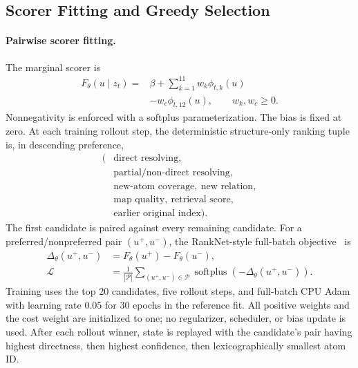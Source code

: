 \subsection{Scorer Fitting and Greedy Selection}
\label{supp:scorer-selector}

\paragraph{Pairwise scorer fitting.}
The marginal scorer is
\begin{equation}
\begin{aligned}
F_\theta(u\mid z_t)
={}&\beta+\sum_{k=1}^{11}w_k\phi_{t,k}(u)\\
&-w_c\phi_{t,12}(u),\qquad w_k,w_c\geq0.
\end{aligned}
\label{eq:supp-marginal-score}
\end{equation}
Nonnegativity is enforced with a softplus parameterization.  The bias is
fixed at zero.  At each training rollout step, the deterministic
structure-only ranking tuple is, in descending preference,
\[
\begin{aligned}
(&\text{direct resolving},\\
&\text{partial/non-direct resolving},\\
&\text{new-atom coverage},\ \text{new relation},\\
&\text{map quality},\ \text{retrieval score},\\
&\text{earlier original index}).
\end{aligned}
\]
The first candidate is paired against every remaining candidate.  For a
preferred/nonpreferred pair \((u^+,u^-)\), the RankNet-style full-batch
objective~\citep{Burges2005RankNet} is
\[
\begin{aligned}
\Delta_\theta(u^+,u^-)
&=F_\theta(u^+)-F_\theta(u^-),\\
\mathcal{L}
&=\frac{1}{|\mathcal{P}|}
\sum_{(u^+,u^-)\in\mathcal{P}}
\operatorname{softplus}\!\left(
-\Delta_\theta(u^+,u^-)\right).
\end{aligned}
\]
Training uses the top 20 candidates, five rollout steps, and full-batch CPU
Adam with learning rate \(0.05\) for 30 epochs in the reference fit.
All positive weights and the cost weight are initialized to one; no
regularizer, scheduler, or bias update is used.  After each rollout winner,
state is replayed with the candidate's pair having highest directness, then
highest confidence, then lexicographically smallest atom ID.

